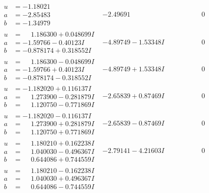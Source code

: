 \documentclass[1p]{elsarticle_modified}
\theoremstyle{definition}
\begin{document}
$$\begin{array}{c|c|c}
\begin{aligned}
u &= -1.18021\phantom{ +0.000000I} \\
a &= -2.85483\phantom{ +0.000000I} \\
b &= -1.34979\phantom{ +0.000000I}\end{aligned}
 & -2.49691\phantom{ +0.000000I} & \phantom{-0.000000 } 0 \\ \hline\begin{aligned}
u &= \phantom{-}1.186300 + 0.048699 I \\
a &= -1.59766 - 0.40123 I \\
b &= -0.878174 + 0.318552 I\end{aligned}
 & -4.89749 - 1.53348 I & \phantom{-0.000000 } 0 \\ \hline\begin{aligned}
u &= \phantom{-}1.186300 - 0.048699 I \\
a &= -1.59766 + 0.40123 I \\
b &= -0.878174 - 0.318552 I\end{aligned}
 & -4.89749 + 1.53348 I & \phantom{-0.000000 } 0 \\ \hline\begin{aligned}
u &= -1.182020 + 0.116137 I \\
a &= \phantom{-}1.273900 - 0.281879 I \\
b &= \phantom{-}1.120750 - 0.771869 I\end{aligned}
 & -2.65839 + 0.87469 I & \phantom{-0.000000 } 0 \\ \hline\begin{aligned}
u &= -1.182020 - 0.116137 I \\
a &= \phantom{-}1.273900 + 0.281879 I \\
b &= \phantom{-}1.120750 + 0.771869 I\end{aligned}
 & -2.65839 - 0.87469 I & \phantom{-0.000000 } 0 \\ \hline\begin{aligned}
u &= \phantom{-}1.180210 + 0.162238 I \\
a &= \phantom{-}1.040030 - 0.496367 I \\
b &= \phantom{-}0.644086 + 0.744559 I\end{aligned}
 & -2.79141 - 4.21603 I & \phantom{-0.000000 } 0 \\ \hline\begin{aligned}
u &= \phantom{-}1.180210 - 0.162238 I \\
a &= \phantom{-}1.040030 + 0.496367 I \\
b &= \phantom{-}0.644086 - 0.744559 I\end{aligned}

\end{array}$$
\end{document}
